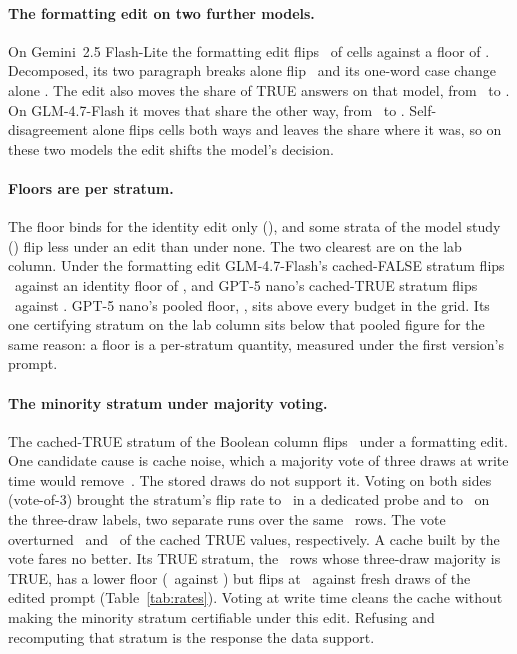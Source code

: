 \keeprunin
\paragraph{The formatting edit on two further models.} On
Gemini~2.5 Flash-Lite the formatting edit flips \famGeminiFmt\ of cells
against a floor of \famGeminiFloor. Decomposed, its two paragraph breaks
alone flip \famGeminiSpaceOnlyFlip\ and its one-word case change alone
\famGeminiCaseOnlyFlip. The edit also moves the share of TRUE answers on
that model, from \famGeminiTrueShareOld\ to \famGeminiTrueShareNew. On
GLM-4.7-Flash it moves that share the other way, from
\famGlmTrueShareOld\ to \famGlmTrueShareNew. Self-disagreement alone
flips cells both ways and leaves the share where it was, so on these two
models the edit shifts the model's decision.

\keeprunin
\paragraph{Floors are per stratum.} The floor binds for the identity
edit only (), and some strata of the model study
() flip
less under an edit than under none. The two clearest are on the lab
column. Under the formatting edit
GLM-4.7-Flash's cached-FALSE stratum flips \famGlmFmtFalseStratum\
against an identity floor of \famGlmFloorFalseStratum, and GPT-5 nano's
cached-TRUE stratum flips \famNanoFmtTrueStratum\ against
\famNanoFloorTrueStratum. GPT-5 nano's pooled floor, \famNanoFloor,
sits above every budget in the grid. Its one certifying stratum on the
lab column sits below that pooled figure for the same reason: a floor
is a per-stratum quantity, measured under the first version's prompt.

\keeprunin
\paragraph{The minority stratum under majority voting.} The cached-TRUE stratum of the
Boolean column flips \minoritySingle\ under a formatting edit. One
candidate cause is cache noise, which a majority vote of three draws at
write time would remove~\cite{selfconsistency}. The stored draws do not
support it. Voting on both sides (vote-of-3) brought the stratum's flip
rate to \minorityVote\ in a dedicated probe and to \minorityVoteRerun\
on the three-draw labels, two separate runs over the same
\votedStoredTrueN\ rows. The vote overturned \minorityNoise\ and
\minorityNoiseRerun\ of the cached TRUE values, respectively. A cache
built by the vote fares no better. Its TRUE stratum, the \votedTrueN\
rows whose three-draw majority is TRUE, has a lower floor
(\votedTrueFloor\ against \floorTrueStratum) but flips at
\votedTrueEditFlip\ against fresh draws of the edited prompt
(Table~\ref{tab:rates}). Voting at write time cleans the cache without
making the minority stratum certifiable under this edit. Refusing and
recomputing that stratum is the response the data support.

